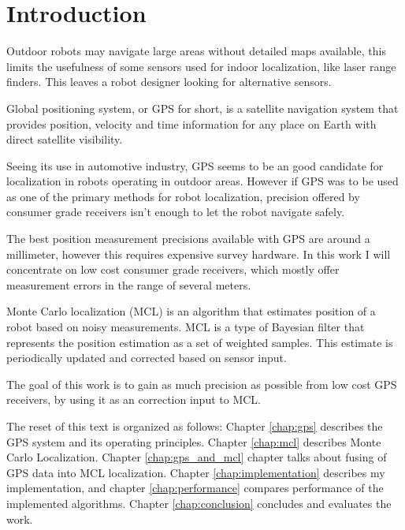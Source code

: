 \chapter{Introduction}


Outdoor robots may navigate large areas without detailed maps available, this limits
the usefulness of some sensors used for indoor localization, like laser range finders.
This leaves a robot designer looking for alternative sensors.




Global positioning system, or GPS for short, is a satellite navigation system that
provides position, velocity and time information for any place on Earth with direct
satellite visibility.

Seeing its use in automotive industry, GPS seems to be an good candidate for
localization in robots operating in outdoor areas.
However if GPS was to be used as one of the primary methods for robot localization,
precision offered by consumer grade receivers isn't enough to let the robot navigate safely.

The best position measurement precisions available with GPS are around a millimeter,
however this requires expensive survey hardware.
In this work I will concentrate on low cost consumer grade receivers, which mostly
offer measurement errors in the range of several meters.




Monte Carlo localization (MCL) is an algorithm that estimates position of a robot
based on noisy measurements.
MCL is a type of Bayesian filter that represents the position estimation as a
set of weighted samples.
This estimate is periodically updated and corrected based on sensor input.




The goal of this work is to gain as much precision as possible from low cost
GPS receivers, by using it as an correction input to MCL.



The reset of this text is organized as follows:
Chapter \ref{chap:gps} describes the GPS system and its operating principles.
Chapter \ref{chap:mcl} describes Monte Carlo Localization.
Chapter \ref{chap:gps_and_mcl} chapter talks about fusing of GPS data into
MCL localization.
Chapter \ref{chap:implementation} describes my implementation,
and chapter \ref{chap:performance} compares performance of the implemented algorithms.
Chapter \ref{chap:conclusion} concludes and evaluates the work.

